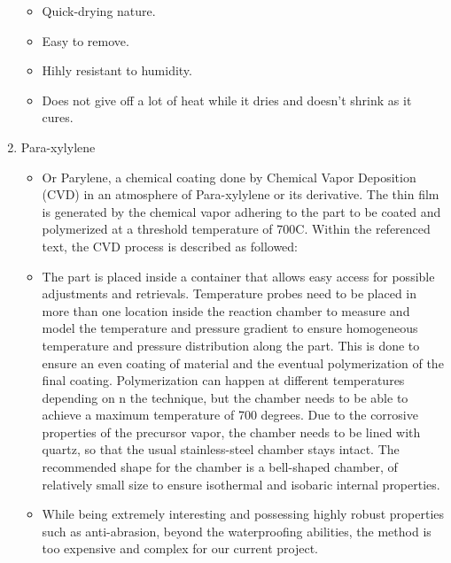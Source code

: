 \begin{enumerate}
          \begin{itemize}
              \item Quick-drying nature.
              \item Easy to remove.
              \item Hihly resistant to humidity.
              \item Does not give off a lot of heat while it dries and doesn't shrink as it cures.
          \end{itemize}
    \item Para-xylylene
          \begin{itemize}
              \item Or Parylene, a chemical coating done by Chemical Vapor Deposition (CVD) in an atmosphere of Para-xylylene or its derivative. The thin film is generated by the chemical vapor adhering to the part to be coated and polymerized at a threshold temperature of 700C. Within the referenced text, the CVD process is described as followed:
              \item The part is placed inside a container that allows easy access for possible adjustments and retrievals. Temperature probes need to be placed in more than one location inside the reaction chamber to measure and model the temperature and pressure gradient to ensure homogeneous temperature and pressure distribution along the part. This is done to ensure an even coating of material and the eventual polymerization of the final coating. Polymerization can happen at different temperatures depending on n the technique, but the chamber needs to be able to achieve a maximum temperature of 700 degrees. Due to the corrosive properties of the precursor vapor, the chamber needs to be lined with quartz, so that the usual stainless-steel chamber stays intact. The recommended shape for the chamber is a bell-shaped chamber, of relatively small size to ensure isothermal and isobaric internal properties.
              \item While being extremely interesting and possessing highly robust properties such as anti-abrasion, beyond the waterproofing abilities, the method is too expensive and complex for our current project.


\end{itemize}
\end{enumerate}
